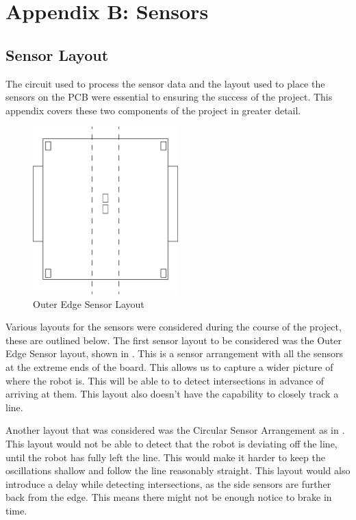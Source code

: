 \documentclass{article}
\begin{document}
\vfill

\clearpage

\section{Appendix B: Sensors}

\subsection{Sensor Layout}

The circuit used to process the sensor data and the layout used to place the sensors on the PCB were essential to ensuring the success of the project. This appendix covers these two components of the project in greater detail.

\begin{figure}[!h]
\centerline{\includegraphics[width=0.5\textwidth]{outer_edge_sensor}}
\caption{Outer Edge Sensor Layout}
\label{fig:outer_edge_sensor}
\end{figure}

Various layouts for the sensors were considered during the course of the project, these are outlined below. The first sensor layout to be considered was the Outer Edge Sensor layout, shown in . This is a sensor arrangement with all the sensors at the extreme ends of the board. This allows us to capture a wider picture of where the robot is. This will be able to to detect intersections in advance of arriving at them. This layout also doesn't have the capability to closely track a line.

Another layout that was considered was the Circular Sensor Arrangement as in . This layout would not be able to detect that the robot is deviating off the line, until the robot has fully left the line. This would make it harder to keep the oscillations shallow and follow the line reasonably straight. This layout would also introduce a delay while detecting intersections, as the side sensors are further back from the edge. This means there might not be enough notice to brake in time.
\end{document}
